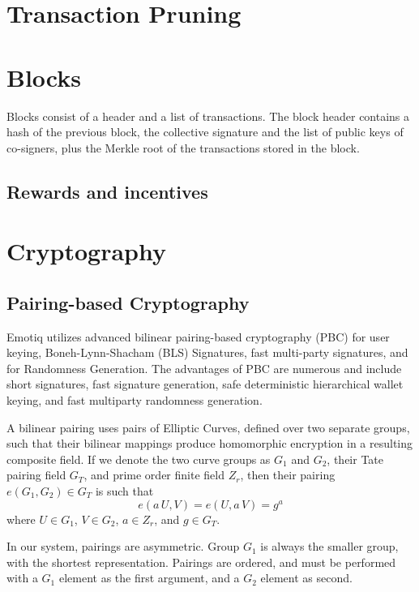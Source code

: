 \documentclass{yellowpaper}
\begin{document}
\section{Transaction Pruning}




\section{Blocks}
Blocks consist of a header and a list of transactions. The block header contains a hash of the previous block, the collective signature and the list of public keys of co-signers, plus the Merkle root of the transactions stored in the block.

\subsection{Rewards and incentives}

\section{Cryptography}
\subsection{Pairing-based Cryptography}
Emotiq utilizes advanced bilinear pairing-based cryptography\cite{thesis}\cite{lib} (PBC) for user keying, Boneh-Lynn-Shacham (BLS) Signatures\cite{bls}, fast multi-party signatures, and for Randomness Generation. The advantages of PBC are numerous and include short signatures, fast signature generation, safe deterministic hierarchical wallet keying, and fast multiparty randomness generation.

A bilinear pairing uses pairs of Elliptic Curves, defined over two separate groups, such that their bilinear mappings produce homomorphic encryption in a resulting composite field. If we denote the two curve groups as $G_1$ and $G_2$,  their Tate pairing field $G_T$, and prime order finite field $Z_r$, then their pairing $e(G_1,G_2) \in G_T$ is such that $$e(a \, U, V) = e(U, a \, V)= g^a$$ where $U \in G_1$, $V \in G_2$, $a \in Z_r$, and $g \in G_T$.

In our system, pairings are asymmetric. Group $G_1$ is always the smaller group, with the shortest representation. Pairings are ordered, and must be performed with a $G_1$ element as the first argument, and a $G_2$ element as second. 
\end{document}
